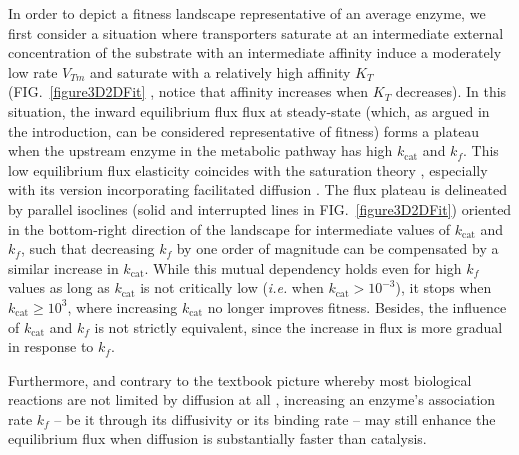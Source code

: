 \documentclass[11pt,onecolumn]{article}
\providecommand{\DIFadd}[1]{{\protect\color{blue} \sf #1}} %
\providecommand{\DIFdel}[1]{{\protect\color{red} \scriptsize #1}} %
\providecommand{\DIFaddbegin}{} %
\providecommand{\DIFaddend}{} %
\providecommand{\DIFdelbegin}{} %
\providecommand{\DIFdelend}{} %
\begin{document}
In order to depict a fitness landscape representative of an average enzyme, we first consider a situation where transporters \DIFdelbegin \DIFdel{saturate at an intermediate external concentration of the substrate with an intermediate affinity }\DIFdelend \DIFaddbegin \DIFadd{induce a moderately low rate $V_{Tm}$ and saturate with a relatively high affinity $K_T$ }\DIFaddend (FIG.~\ref{figure3D2DFit}\DIFaddbegin \DIFadd{, notice that affinity increases when $K_T$ decreases}\DIFaddend ). In this situation, the inward \DIFdelbegin \DIFdel{equilibrium flux }\DIFdelend \DIFaddbegin \DIFadd{flux at steady-state }\DIFaddend (which, as argued in the introduction, can be considered representative of fitness) forms a plateau when the upstream enzyme in the metabolic pathway has high $k_\text{cat}$ and $k_f$. This low equilibrium flux elasticity coincides with the saturation theory \DIFdelbegin \DIFdel{\citep{Wright34, Kacser73}}\DIFdelend \DIFaddbegin \DIFadd{\citep{Wright34, Kacser73,Hartl85,Dykhuizen87,Dean95,Yi19}}\DIFaddend , especially with its version incorporating facilitated diffusion \DIFdelbegin \DIFdel{\citep{Kuile94}}\DIFdelend \DIFaddbegin \DIFadd{\citep{Kuile94,Dean95}}\DIFaddend . The flux plateau is delineated by parallel isoclines (solid and interrupted lines in FIG.~\ref{figure3D2DFit}) oriented in the bottom-right direction of the landscape for intermediate values of $k_\text{cat}$ and $k_f$, such that decreasing $k_f$ by one order of magnitude can be compensated by a similar increase in $k_\text{cat}$. While this mutual dependency holds even for high $k_f$ values as long as $k_\text{cat}$ is not critically low (\textit{i.e.} when $k_\text{cat}>10^{-3}$), it stops when $k_\text{cat}\geq 10^3$, where increasing $k_\text{cat}$ no longer improves fitness. 
Besides, the influence of $k_\text{cat}$ and $k_f$ is not strictly equivalent, since the increase in flux is more gradual in response to $k_f$. 

Furthermore, and contrary to the textbook picture whereby most biological reactions are not limited by diffusion at all \citep{Bar-Even11,Sweetlove18}, increasing an enzyme's association rate $k_f$ – be it through its diffusivity or its binding rate – may still enhance the equilibrium flux when diffusion is substantially faster than catalysis.
\end{document}
